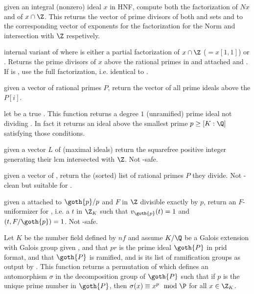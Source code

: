  given an integral
(nonzero) ideal $x$ in HNF, compute both the factorization of $Nx$ and
of $x\cap\Z$. This returns the vector of prime divisors of both
and sets  and  to the corresponding  vector
of exponents for the factorization for the Norm and intersection with $\Z$
respetively.

 internal
variant of  where  is either a partial
factorization of $x\cap \Z$ ($= x[1,1]$) or . Returns the prime
divisors of $x$ above the rational primes in  and attached 
and . If  is , use the full factorization, i.e.
identical to .

 given a vector of rational primes
$P$, return the vector of all prime ideals above the $P[i]$.

 let  be a true . This
function returns a degree $1$ (unramified) prime ideal not dividing
. In fact it returns an ideal above the smallest prime
$p \geq [K:\Q]$ satisfying those conditions.

 given a vector $L$ of 
(maximal ideals) return the squarefree positive integer generating their
lcm intersected with $\Z$. Not -safe.

 given a vector of ,
return the (sorted) list of rational primes $P$ they divide. Not
-clean but suitable for .

 given a  attached to
$\goth{p} / p$ and $F$ in $\Z$ divisible exactly by $p$, return an
$F$-uniformizer for , i.e. a $t$ in $\Z_K$ such that $v_{\goth{p}}(t)
= 1$ and $(t, F/\goth{p}) = 1$. Not -safe.


Let $K$ be the number field defined by $nf$ and assume $K/\Q$ be a
Galois extension with Galois group given ,
and that $pr$ is the prime ideal $\goth{P}$ in prid format, and that
$\goth{P}$ is ramified, and  is its list of ramification groups as
output by .
This function returns a permutation of  which defines an
automorphism $\sigma$ in the decomposition group of $\goth{P}$
such that if $p$ is the unique prime number
in $\goth{P}$, then $\sigma(x)\equiv x^p\mod\P$ for all $x\in\Z_K$.

